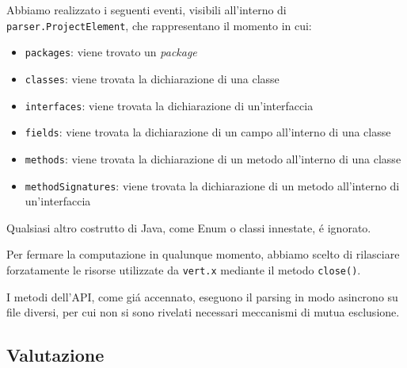 \documentclass[report]{subfiles}
\begin{document}
	Abbiamo realizzato i seguenti eventi, visibili all'interno di \texttt{parser.ProjectElement}, che rappresentano il momento in cui:
	\begin{itemize}
		\item \texttt{packages}: viene trovato un \emph{package}
		\item \texttt{classes}: viene trovata la dichiarazione di una classe
		\item \texttt{interfaces}: viene trovata la dichiarazione di un'interfaccia
		\item \texttt{fields}: viene trovata la dichiarazione di un campo all'interno di una classe
		\item \texttt{methods}: viene trovata la dichiarazione di un metodo all'interno di una classe
		\item \texttt{methodSignatures}: viene trovata la dichiarazione di un metodo all'interno di un'interfaccia
	\end{itemize}
	
	Qualsiasi altro costrutto di Java, come Enum o classi innestate, \'e ignorato.
	
	Per fermare la computazione in qualunque momento, abbiamo scelto di rilasciare forzatamente le risorse utilizzate da \texttt{vert.x} mediante il metodo \texttt{close()}.
	
	I metodi dell'API, come gi\'a accennato, eseguono il parsing in modo asincrono su file diversi, per cui non si sono rivelati necessari meccanismi di mutua esclusione.
	
	\subsection{Valutazione}
\end{document}
